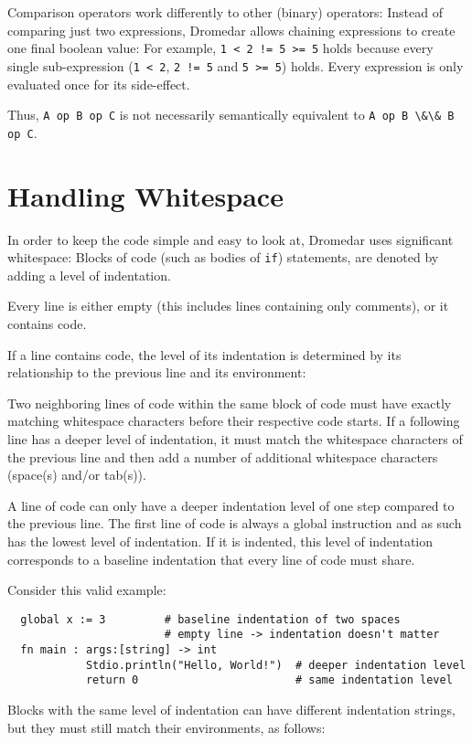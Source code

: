 \documentclass{article}
\newcommand{\code}[1]{\lstinline[columns=fixed]{#1}}
\begin{document}
		Comparison operators work differently to other (binary) operators: Instead of comparing just two expressions, Dromedar allows chaining expressions to create one final boolean value: For example, \code{1 < 2 != 5 >= 5} holds because every single sub-expression (\code{1 < 2}, \code{2 != 5} and \code{5 >= 5}) holds. Every expression is only evaluated once for its side-effect.
		
		Thus, \code{A op B op C} is not necessarily semantically equivalent to \code{A op B \&\& B op C}.
		
	\section{Handling Whitespace}
	
		In order to keep the code simple and easy to look at, Dromedar uses significant whitespace: Blocks of code (such as bodies of \code{if}) statements, are denoted by adding a level of indentation.
		
		Every line is either empty (this includes lines containing only comments), or it contains code. 
		
		If a line contains code, the level of its indentation is determined by its relationship to the previous line and its environment:
		
		Two neighboring lines of code within the same block of code must have exactly matching whitespace characters before their respective code starts. If a following line has a deeper level of indentation, it must match the whitespace characters of the previous line and then add a number of additional whitespace characters (space(s) and/or tab(s)).
		
		A line of code can only have a deeper indentation level of one step compared to the previous line. The first line of code is always a global instruction and as such has the lowest level of indentation. If it is indented, this level of indentation corresponds to a baseline indentation that every line of code must share.
		
		Consider this valid example:
		
		\begin{lstlisting}
  global x := 3 		# baseline indentation of two spaces
						# empty line -> indentation doesn't matter
  fn main : args:[string] -> int
  			Stdio.println("Hello, World!")	# deeper indentation level
  			return 0						# same indentation level
		\end{lstlisting}
		
		Blocks with the same level of indentation can have different indentation strings, but they must still match their environments, as follows:
		
\end{document}
